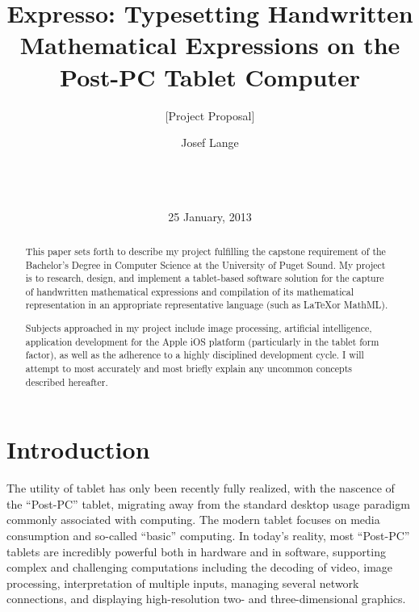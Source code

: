 \documentclass{acm_proc_article-sp}
\begin{document}
\title{ Expresso: Typesetting Handwritten Mathematical Expressions on the Post-PC Tablet Computer }
\subtitle{[Project Proposal]}


\author{
\alignauthor
Josef Lange\\
       \\
       \\
       \\
       }
       
\date{25 January, 2013}

\maketitle

\begin{abstract}
This paper sets forth to describe my project fulfilling the capstone requirement of the Bachelor's Degree in Computer Science at the University of Puget Sound. My project is to research, design, and implement a tablet-based software solution for the capture of handwritten mathematical expressions and compilation of its mathematical representation in an appropriate representative language (such as \LaTeX or MathML).

Subjects approached in my project include image processing, artificial intelligence, application development for the Apple iOS platform (particularly in the tablet form factor), as well as the adherence to a highly disciplined development cycle. I will attempt to most accurately and most briefly explain any uncommon concepts described hereafter.
\end{abstract}

\section{Introduction}
The utility of tablet has only been recently fully realized, with the nascence of the ``Post-PC'' tablet, migrating away from the standard desktop usage paradigm commonly associated with computing. The modern tablet focuses on media consumption and so-called ``basic'' computing. In today's reality, most ``Post-PC'' tablets are incredibly powerful both in hardware and in software, supporting complex and challenging computations including the decoding of video, image processing, interpretation of multiple inputs, managing several network connections, and displaying high-resolution two- and three-dimensional graphics.
\end{document}

